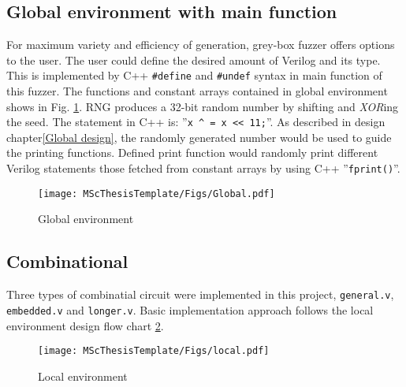 \subsection{Global environment with main function}
For maximum variety and efficiency of generation, grey-box fuzzer offers options to the user. The user could define the desired amount of Verilog and its type. This is implemented by C++ \texttt{\#define} and \texttt{\#undef} syntax in main function of this fuzzer. The functions and constant arrays contained in global environment shows in Fig. \ref{fig:global}. RNG produces a 32-bit random number by shifting and \textit{XOR}ing the seed. The statement in C++ is: ''\texttt{x \^{}  = x << 11;}''. As described in design chapter\ref{Global design}, the randomly generated number would be used to guide the printing functions. Defined print function would randomly print different Verilog statements those fetched from constant arrays by using C++ ''\texttt{fprint()}''.
\begin{figure}[htb]
    \centering
    \texttt{[image: MScThesisTemplate/Figs/Global.pdf]}
    \caption{\footnotesize Global environment}
    \label{fig:global}
\end{figure}

\subsection{Combinational}
Three types of combinatial circuit were implemented in this project, \texttt{general.v}, \texttt{embedded.v} and \texttt{longer.v}. Basic implementation approach follows the local environment design flow chart \ref{fig:local}. 
\begin{figure}[htb]
    \centering
    \texttt{[image: MScThesisTemplate/Figs/local.pdf]}
    \caption{\footnotesize Local environment}
    \label{fig:local}
\end{figure}
